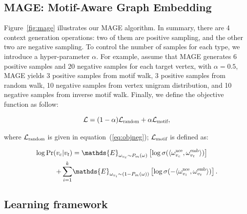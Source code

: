 \documentclass[letterpaper]{article}
\begin{document}
        \subsection{MAGE: Motif-Aware Graph Embedding}

            Figure~\ref{fig:mage} illustrates our MAGE algorithm. In summary, 
            there are 4 context generation operations: two of them are positive sampling, and the other
            two are negative sampling. To control the number of samples for each type, we introduce a 
            hyper-parameter $\alpha$. For example, assume that MAGE generates 6 positive samples and 
            20 negative samples for each target vertex, with $\alpha=0.5$, MAGE yields 3 positive samples 
            from motif walk, 3 positive samples from random walk, 10 negative samples from vertex unigram
            distribution, and 10 negative samples from inverse motif walk.  Finally, we define the 
            objective function as follow:

            \begin{equation}
                \label{eq:mageobj}
                \mathcal{L} = (1-\alpha) \mathcal{L}_{\scalebox{0.7}{random}} + 
                                \alpha \mathcal{L}_{\scalebox{0.7}{motif}} ,
            \end{equation}

            \noindent
            where $\mathcal{L}_{\scalebox{0.7}{random}}$ is given in equation~(\ref{eq:objneg});
            $\mathcal{L}_{\scalebox{0.7}{motif}}$ is defined as:

            \begin{equation}
                \label{eq:objmotif}
                \begin{aligned}
                    \log \mbox{Pr} (v_c | v_t) & = \mathds{E}_{\omega_{v_c} \sim P_m(\omega)} \left[ \log \sigma( \langle \omega^{\scalebox{0.7}{nce}}_{v_c} , \omega^{\scalebox{0.7}{emb}}_{v_t} \rangle ) \right] \\
                + \sum_{i=1}^{k} & \mathds{E}_{\omega_{v_i} \sim (1-P_m(\omega))} \left[ \log \sigma( -\langle \omega^{\scalebox{0.7}{nce}}_{v_i} , \omega^{\scalebox{0.7}{emb}}_{v_t} \rangle) \right] .
                \end{aligned}
            \end{equation}

        \subsection{Learning framework}
            
\end{document}

